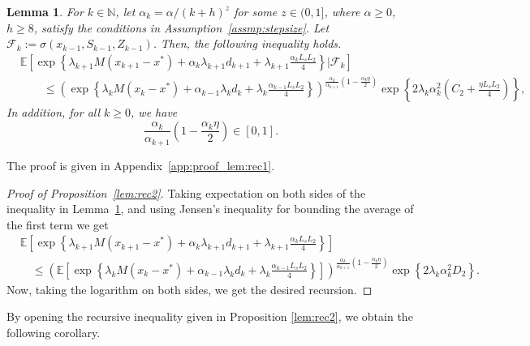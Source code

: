 \documentclass{article}
\newcommand{\numberthis}{\addtocounter{equation}{1}\tag{\theequation}}
\newcommand{\lrset}[1]{\left\{ #1 \right\}}
\newcommand{\lrp}[1]{\left( #1 \right)}
\newcommand{\lrs}[1]{\left[ #1 \right]}
\newcommand{\E}[1]{\mathbb{E}\lrs{#1}}
\newcommand{\N}{\mathbb{N}}
\newcommand{\xk}{x_k}
\newtheorem{lemma}[theorem]{Lemma}
\begin{document}
\begin{lemma}\label{lem:rec1}
    For $k\in\N$, let $\alpha_k = \alpha/(k+h)^z$ for some $z\in (0,1]$, where $\alpha \ge 0$, $h \ge 8$, satisfy the conditions in Assumption~\ref{assmp:stepsize}. Let $\mathcal F_k := \sigma(x_{k-1}, S_{k-1}, Z_{k-1})$. Then, the following inequality holds. 
\begin{align*}
        &\E{ \exp\lrset{{\lambda_{k+1}M(x_{k+1} - x^*) + \alpha_k \lambda_{k+1} d_{k+1} + \lambda_{k+1}\tfrac{\alpha_k L_sL_2 }{4 } }} \big| \mathcal F_k }\\
        &\qquad \le \lrp{\exp\lrset{ { \lambda_{k}M(\xk - x^*) + \alpha_{k-1}\lambda_{k} d_k + \lambda_{k}\tfrac{\alpha_{k-1} L_sL_2}{4}}}}^{\frac{\alpha_{k}}{\alpha_{k+1}}\left(1-\tfrac{\alpha_k \eta}{2}\right)} \exp\lrset{2 \lambda_k \alpha^2_k \lrp{C_2 + \tfrac{\eta L_sL_2}{4} }},%
\end{align*}
In addition, for all $k\ge 0$, we have
\[ \frac{\alpha_k}{\alpha_{k+1}}\left(1-\frac{\alpha_k \eta}{2}\right) \in [0,1]. \]
\end{lemma}
The proof is given in Appendix~\ref{app:proof_lem:rec1}. 

\begin{proof}[Proof of Proposition~\ref{lem:rec2}]
Taking expectation on both sides of the inequality in Lemma~\ref{lem:rec1}, and using Jensen's inequality for bounding the average of the first term we get 
\begin{align*}
        &\E{ \exp\lrset{{\lambda_{k+1}M(x_{k+1} - x^*) + \alpha_k \lambda_{k+1}d_{k+1} + \lambda_{k+1}\tfrac{\alpha_k L_sL_2 }{4} }}}\\
        &\quad \le \lrp{\E{\exp\lrset{ {\lambda_{k} M(\xk - x^*) + \alpha_{k-1}\lambda_{k}d_k + \lambda_{k}\tfrac{\alpha_{k-1} L_sL_2}{4} }}}}^{\frac{\alpha_k}{\alpha_{k+1}}\left(1-\tfrac{\alpha_k \eta}{2}\right)}  \exp\lrset{2 \lambda_k \alpha^2_k D_2}.
\end{align*}  
Now, taking the logarithm on both sides, we get the desired recursion. 
\end{proof}

By opening the recursive inequality given in Proposition \ref{lem:rec2}, we obtain the following corollary.
\end{document}
